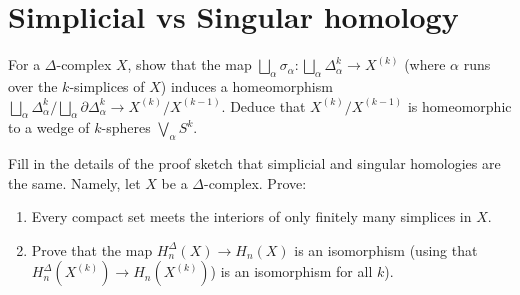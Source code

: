 \documentclass[11pt,a4paper]{article}
\begin{document}
\section{Simplicial vs Singular homology}

\begin{exercise}
  For a $\Delta$-complex $X$,
  show that the map $\bigsqcup_{\alpha} \sigma_{\alpha} \colon
    \bigsqcup_{\alpha} \Delta^k_{\alpha} \to X^{(k)}$
    (where $\alpha$ runs over the $k$-simplices of $X$)
  induces a homeomorphism $\bigsqcup_{\alpha} \Delta^k_{\alpha} /
  \bigsqcup_{\alpha} \partial \Delta^k_{\alpha} \to X^{(k)} / X^{(k-1)}$.
  Deduce that $X^{(k)} / X^{(k-1)}$ is homeomorphic to a wedge of
  $k$-spheres $\bigvee_{\alpha} S^k$.
\end{exercise}
\begin{solution}

\end{solution}

\begin{exercise}
  Fill in the details  of the proof sketch that simplicial and singular
  homologies are the same.
  Namely, let $X$ be a $\Delta$-complex.
  Prove:
  \begin{enumerate}
    \item[(1)] Every compact set meets the interiors of only finitely many
      simplices in $X$.
    \item[(2)] Prove that the map $H_{n}^{\Delta}(X) \to H_n(X)$
      is an isomorphism (using that $H_{n}^{\Delta}(X^{(k)}) \to H_n(X^{(k)})$)
      is an isomorphism for all $k$).
  \end{enumerate}
\end{exercise}
\begin{solution}

\end{solution}
\end{document}
